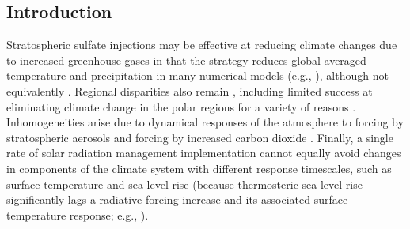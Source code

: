 \documentclass[draft,grl]{AGUTeX}  %
\begin{document}
\begin{article}
\section{Introduction}

Stratospheric sulfate injections may be effective at reducing climate changes due to increased greenhouse gases in that the strategy reduces global averaged temperature and precipitation in many numerical models (e.g., \cite{kravitz13}), although not equivalently \citep{bala08}. Regional disparities also remain \citep{ricke10}, including limited success at eliminating climate change  in the polar regions for a variety of reasons \citep{mccusker12}. Inhomogeneities arise due to dynamical responses of the atmosphere to forcing by stratospheric aerosols and forcing by increased carbon dioxide \citep{ammann10,mccusker12}. Finally, a single rate of solar radiation management implementation cannot equally avoid changes in components of the climate system with different response timescales, such as surface temperature and sea level rise \citep{irvine12} (because thermosteric sea level rise significantly lags a radiative forcing increase and its associated surface temperature response; e.g., \cite{wigley06,solomon10}). 




\end{article}
\end{document}
